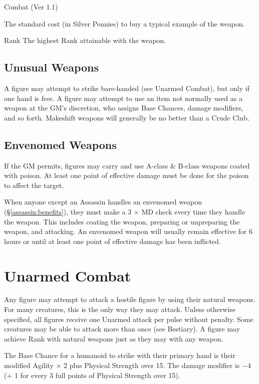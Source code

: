 \begin{Chapter}{Combat (Ver 1.1)}
\begin{Description}
\item[Cost] The standard cost (in Silver Pennies) to buy a typical
  example of the weapon.

\item[Maximum] Rank The highest Rank attainable with the weapon.

\end{Description}
  
\subsection{Unusual Weapons}

A figure may attempt to strike bare-handed (see Unarmed Combat), but
only if one hand is free.  A figure may attempt to use an item not
normally used as a weapon at the GM’s discretion, who assigns Base
Chances, damage modifiers, and so forth.  Makeshift weapons will
generally be no better than a Crude Club.

\subsection{Envenomed Weapons}

If the GM permits, figures may carry and use A-class \& B-class
weapons coated with poison.  At least one point of effective damage
must be done for the poison to affect the target.

When anyone except an Assassin handles an envenomed weapon
(\S\ref{assassin:benefits}), they must make a 3 × MD check every time
they handle the weapon.  This includes coating the weapon, preparing
or unpreparing the weapon, and attacking. An envenomed weapon will
usually remain effective for 6 hours or until at least one point of
effective damage has been inflicted.

\section{Unarmed Combat}
\label{combat:unarmed}

Any figure may attempt to attack a hostile figure by using their
natural weapons.  For many creatures, this is the only way they may
attack.  Unless otherwise specified, all figures receive one Unarmed
attack per pulse without penalty.  Some creatures may be able to
attack more than once (see Bestiary).  A figure may achieve Rank with
natural weapons just as they may with any weapon.

The Base Chance for a humanoid to strike with their primary hand is
their modified Agility × 2 plus Physical Strength over 15.  The damage
modifier is −4 (+ 1 for every 3 full points of Physical Strength over
15).


\end{Chapter}
